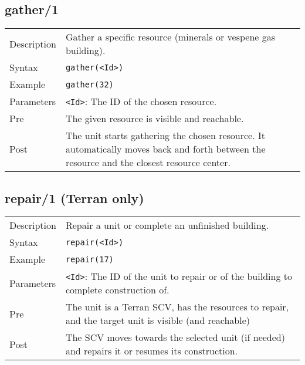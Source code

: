\subsection{gather/1}
\begin{tabularx}{\textwidth}{lX}
 Description & Gather a specific resource (minerals or vespene gas building). \\
 Syntax & \verb|gather(<Id>)| \\
 Example & \verb|gather(32)| \\
 Parameters & \verb|<Id>|: The ID of the chosen resource. \\
 Pre & The given resource is visible and reachable. \\
 Post & The unit starts gathering the chosen resource. It automatically moves back and forth between the resource and the closest resource center.
\end{tabularx}

\subsection{repair/1 (Terran only)}
\begin{tabularx}{\textwidth}{lX}
 Description & Repair a unit or complete an unfinished building. \\
 Syntax & \verb|repair(<Id>)| \\
 Example & \verb|repair(17)| \\
 Parameters & \verb|<Id>|: The ID of the unit to repair or of the building to complete construction of. \\
 Pre & The unit is a Terran SCV, has the resources to repair, and the target unit is visible (and reachable) \\
 Post & The SCV moves towards the selected unit (if needed) and repairs it or resumes its construction.
\end{tabularx}